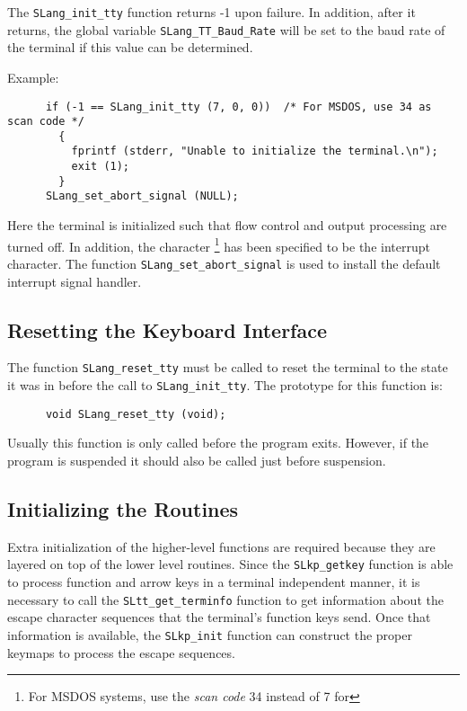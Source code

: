   The \verb|SLang_init_tty| function returns -1 upon failure.  In addition,
  after it returns, the \slang{} global variable \verb|SLang_TT_Baud_Rate|
  will be set to the baud rate of the terminal if this value can be
  determined.

  Example:
\begin{verbatim}   
      if (-1 == SLang_init_tty (7, 0, 0))  /* For MSDOS, use 34 as scan code */
        {
          fprintf (stderr, "Unable to initialize the terminal.\n");
          exit (1);
        }
      SLang_set_abort_signal (NULL);
\end{verbatim}
   Here the terminal is initialized such that flow control and output
   processing are turned off.  In addition, the character
   \footnote{For MSDOS systems, use the {\em scan code} 34
   instead of 7 for } has been specified to be the interrupt
   character.  The function \verb|SLang_set_abort_signal| is used to
   install the default \slang{} interrupt signal handler.


\subsection{Resetting the Keyboard Interface} %

  The function \verb|SLang_reset_tty| must be called to reset the terminal
  to the state it was in before the call to \verb|SLang_init_tty|.  The
  prototype for this function is:
\begin{verbatim}
      void SLang_reset_tty (void);
\end{verbatim}
  Usually this function is only called before the program exits.  However,
  if the program is suspended it should also be called just before suspension.
  

\subsection{Initializing the  Routines} %

  Extra initialization of the higher-level  functions are
  required because they are layered on top of the lower level
  routines.  Since the \verb|SLkp_getkey| function is able to process
  function and arrow keys in a terminal independent manner, it is
  necessary to call the \verb|SLtt_get_terminfo| function to get
  information about the escape character sequences that the terminal's
  function keys send.  Once that information is available, the
  \verb|SLkp_init| function can construct the proper keymaps to
  process the escape sequences.
  
